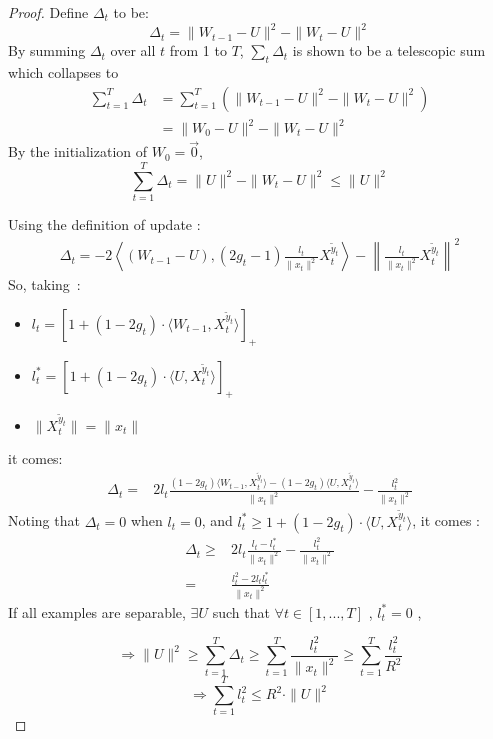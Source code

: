 \documentclass[preprint,12pt,authoryear]{elsarticle}
\begin{document}
\begin{proof}
	Define $\Delta_t$ to be:
	\[\Delta_t = \parallel{W_{t-1}-U}\parallel^2-\parallel{W_t-U}\parallel^2\]
	By summing $\Delta_t$ over all $t$ from 1 to $T$,  $\sum_t \Delta_t$ is shown to be a telescopic sum which collapses to
	\begin{align}
	\sum_{t=1}^{T}\Delta_t &= \sum_{t=1}^{T} \left( \parallel{W_{t-1} - U}\parallel^2-\parallel{W_t - U}\parallel^2 \right)\nonumber\\ 
	&= \parallel{W_0 - U}\parallel^2-\parallel{W_t-U}\parallel^2\nonumber
	\end{align}	
	By the initialization of $W_0 = \vec{0}$, 
	\begin{equation}
	\label{equa:delta}
	\sum_{t=1}^{T}\Delta_t = \parallel{U}\parallel^2 - \parallel{W_t-U}\parallel^2 \leqslant \parallel{U}\parallel^2 
	\end{equation}
	
	Using the definition of update : %
	\begin{align}
	\Delta_t = -2\left\langle (W_{t-1} - U), (2g_t-1)\frac{l_t}{\parallel{x_t}\parallel^2}X_t^{\tilde{y}_t}\right\rangle 
	- \left\| \frac{l_t}{\parallel{x_t}\parallel^2}X_t^{\tilde{y}_t}\right\|^2
	\nonumber
	\end{align}
	So, taking~:
	\begin{itemize}
		\item[] $l_t = [1+(1-2g_t)\cdot\langle W_{t-1},X_t^{\tilde{y}_t}\rangle]_+$
		\item[] $l_t^{\ast} = [1+(1-2g_t)\cdot\langle U,X_t^{\tilde{y}_t}\rangle]_+$
		\item[] $\parallel{X_t^{\tilde{y}_t}}\parallel = \parallel x_t\parallel$
	\end{itemize}
	it comes:
	\begin{align}
	\Delta_t =& 2l_t\frac{(1-2g_t)\langle W_{t-1}, X_t^{\tilde{y}_t}\rangle - (1-2g_t)\langle U, X_t^{\tilde{y}_t}\rangle}{\|x_t\|^2}
	-\frac{l_t^2}{\parallel{x_t}\parallel^2}\nonumber
	\end{align}
	Noting that $\Delta_t = 0$ when $l_t = 0$, and $l^*_t \geq  1+(1-2g_t)\cdot\langle U,X_t^{\tilde{y}_t}\rangle$, it comes : 
	\begin{align}
	\Delta_t\geqslant& 2l_t\frac{l_t - l_t^{\ast}}{\parallel{x_t}\parallel^2}-\frac{l_t^2}{\parallel{x_t}\parallel^2}\nonumber\\
	=& \frac{l_t^2-2l_t l_t^{\ast}}{\parallel x_t\parallel^2}\nonumber
	\end{align}
	If all examples are separable, $\exists U$ such that $\forall t \in [1,...,T]$ , $l_t^{\ast} = 0$ ,
	
	\[\Rightarrow \parallel{U}\parallel^2 \geqslant \sum_{t=1}^{T}\Delta_t \geqslant \sum_{t=1}^{T}  \frac{l_t^2}{\parallel{x_t}\parallel^2}
	\geqslant 
	\sum_{t=1}^{T}  \frac{l_t^2}{R^2}
	\]
	\[\Rightarrow\sum_{t=1}^{T} l_t^2 \leqslant R^2 \cdot \parallel{U}\parallel^2\]
\end{proof}
\end{document}
